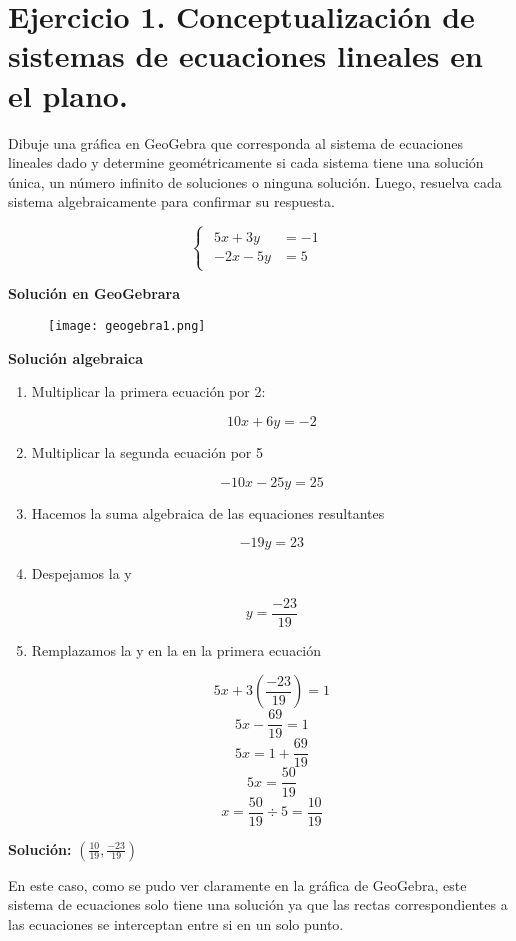 \section{\large Ejercicio 1. Conceptualización de sistemas de ecuaciones lineales en el plano.}

Dibuje una gráfica en GeoGebra que corresponda al sistema de ecuaciones lineales dado y determine geométricamente si cada sistema tiene una solución única, un número infinito de soluciones o ninguna solución. Luego, resuelva cada sistema algebraicamente para confirmar su respuesta.

\[
\begin{cases}
    \begin{aligned}
        5x+3y &=-1 \\
        -2x-5y &=5
    \end{aligned}
\end{cases}
\]

\textbf{Solución en GeoGebrara}
\begin{figure}[ht!]
    \texttt{[image: geogebra1.png]}
\end{figure}

\textbf{Solución algebraica}

\begin{enumerate}
    \item Multiplicar la primera ecuación por 2:
    
    \[10x+6y=-2\]

    \item Multiplicar la segunda ecuación por 5
    
    \[-10x-25y=25\]

    \item Hacemos la suma algebraica de las equaciones resultantes
    
    \[-19y=23\]

    \item Despejamos la y
    
    \[y=\frac{-23}{19}\]
    
    \item Remplazamos la y en la en la primera ecuación
    
    \[5x+3\left(\frac{-23}{19}\right)=1\]
    \[5x-\frac{69}{19}=1\]
    \[5x=1+\frac{69}{19}\]
    \[5x=\frac{50}{19}\]
    \[x=\frac{50}{19}\div5=\frac{10}{19}\]
\end{enumerate}

\begin{center}
    \textbf{Solución:} \(\left(\frac{10}{19},\frac{-23}{19}\right)\)
\end{center}

En este caso, como se pudo ver claramente en la gráfica de GeoGebra, este sistema de ecuaciones solo tiene una solución ya que las rectas correspondientes a las ecuaciones se interceptan entre si en un solo punto.
